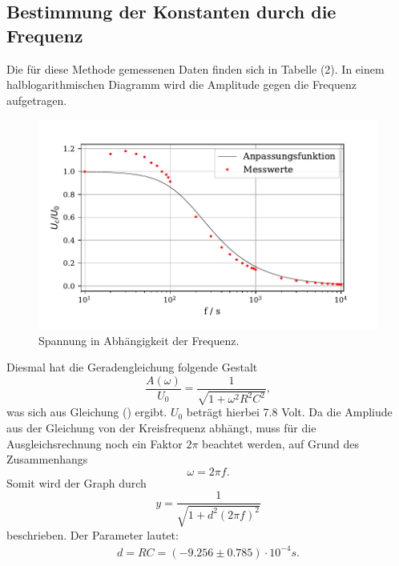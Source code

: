 \subsection{Bestimmung der Konstanten durch die Frequenz}
Die für diese Methode gemessenen Daten finden sich in Tabelle (2). 
In einem halblogarithmischen Diagramm wird die Amplitude gegen die Frequenz aufgetragen.

\begin{figure}[H]
  \centering
  \includegraphics{plot2.pdf}
  \caption{Spannung in Abhängigkeit der Frequenz.}
  \label{fig:plot}
\end{figure}

\noindent Diesmal hat die Geradengleichung folgende Gestalt
\begin{equation*}
    \frac{A(\omega)}{U_0} = \frac{1}{ \sqrt{1+\omega^2R^2C^2}} ,
\end{equation*}
was sich aus Gleichung () ergibt. $U_0$ beträgt hierbei 7.8 Volt. Da die Ampliude aus der Gleichung von der Kreisfrequenz abhängt, 
muss für die Ausgleichsrechnung noch ein Faktor $2\pi$ beachtet werden, auf Grund des Zusammenhangs
\begin{equation}
    \omega = 2\pi f .
\end{equation}
Somit wird der Graph durch
\begin{equation}
    y = \frac{1}{ \sqrt{1+d^2(2\pi f)^2}} 
\end{equation}
beschrieben.
Der Parameter lautet:
\begin{align*}
   d = RC = (-9.256\pm  0.785)\cdot 10^{-4} s .
\end{align*}


